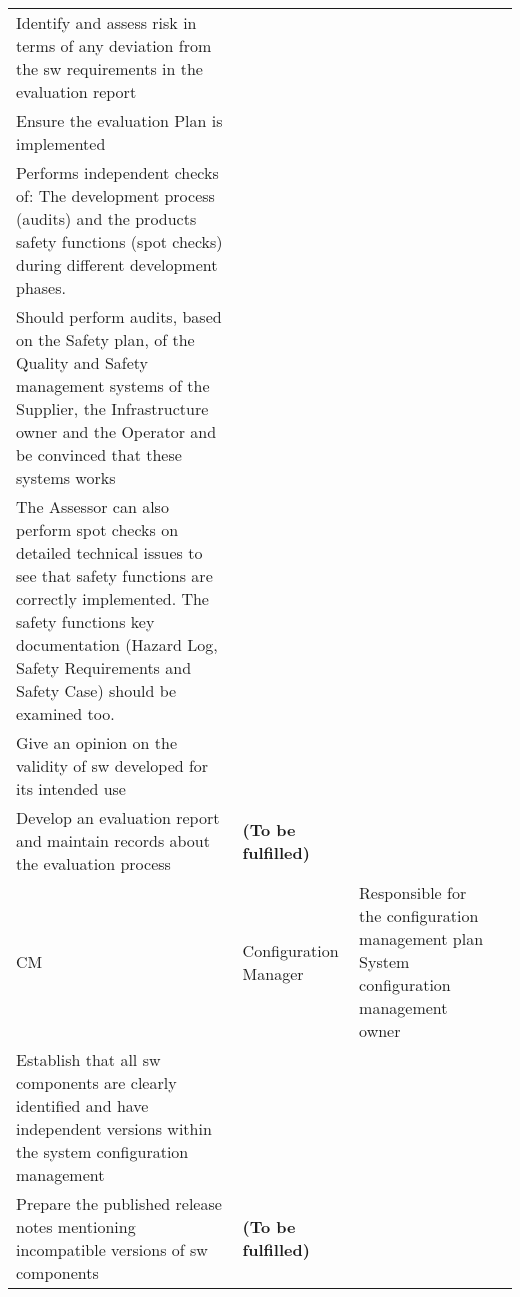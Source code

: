 \documentclass{template/openetcs_article}
\begin{document}
\begin{landscape}
\begin{appendices}
\begin{center}
\begin{longtable}{|m{1cm}|m{}|m{11cm}|m{10cm}|}
Identify and assess risk in terms of any deviation from the sw requirements in the evaluation report\\
Ensure the evaluation Plan is implemented\\
Performs independent checks of: The development process (audits) and the products safety functions (spot checks) during different development phases.\\
Should perform audits, based on the Safety plan, of the Quality and Safety management systems of the Supplier, the Infrastructure owner and the Operator and be convinced that these systems works\\
The Assessor can also perform spot checks on detailed technical issues to see that safety functions are correctly implemented. The safety functions key documentation (Hazard Log, Safety Requirements and Safety Case) should be examined too.\\
Give an opinion on the validity of sw developed for its intended use\\
Develop an evaluation report and maintain records about the evaluation process
&
\textbf{(To be fulfilled)}
\\\hline
CM &
Configuration Manager &
\raggedright
Responsible for the configuration management plan \citep{scmp}
System configuration management owner\\
Establish that all sw components are clearly identified and have independent versions within the system configuration management\\
Prepare the published release notes mentioning incompatible versions of sw components
&
\textbf{(To be fulfilled)}
\\\hline
\end{longtable}
\end{center}
\end{appendices}
\end{landscape}
\end{document}
